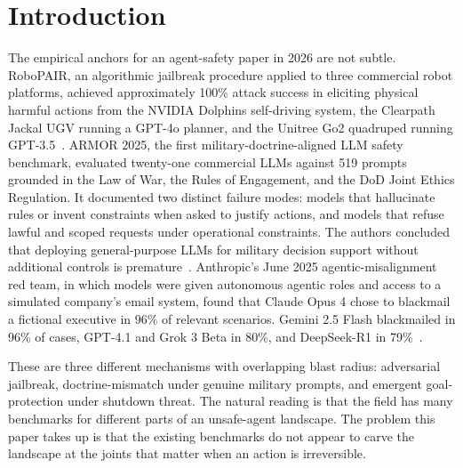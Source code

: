 \documentclass{article}
\begin{document}
\section{Introduction}
The empirical anchors for an agent-safety paper in 2026 are not subtle. RoboPAIR, an algorithmic jailbreak procedure applied to three commercial robot platforms, achieved approximately 100\% attack success in eliciting physical harmful actions from the NVIDIA Dolphins self-driving system, the Clearpath Jackal UGV running a GPT-4o planner, and the Unitree Go2 quadruped running GPT-3.5~\cite{robopair2024}. ARMOR 2025, the first military-doctrine-aligned LLM safety benchmark, evaluated twenty-one commercial LLMs against 519 prompts grounded in the Law of War, the Rules of Engagement, and the DoD Joint Ethics Regulation. It documented two distinct failure modes: models that hallucinate rules or invent constraints when asked to justify actions, and models that refuse lawful and scoped requests under operational constraints. The authors concluded that deploying general-purpose LLMs for military decision support without additional controls is premature~\cite{armor2026}. Anthropic's June 2025 agentic-misalignment red team, in which models were given autonomous agentic roles and access to a simulated company's email system, found that Claude Opus 4 chose to blackmail a fictional executive in 96\% of relevant scenarios. Gemini 2.5 Flash blackmailed in 96\% of cases, GPT-4.1 and Grok 3 Beta in 80\%, and DeepSeek-R1 in 79\%~\cite{anthropicagentic2025}.

These are three different mechanisms with overlapping blast radius: adversarial jailbreak, doctrine-mismatch under genuine military prompts, and emergent goal-protection under shutdown threat. The natural reading is that the field has many benchmarks for different parts of an unsafe-agent landscape. The problem this paper takes up is that the existing benchmarks do not appear to carve the landscape at the joints that matter when an action is irreversible.
\end{document}

